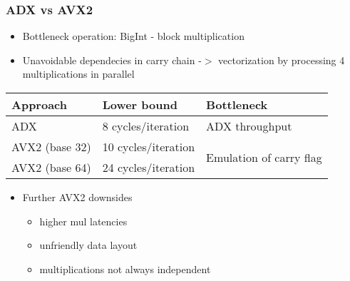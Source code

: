 \begin{frame}
\frametitle{ADX vs AVX2}
\begin{itemize}
\item{Bottleneck operation: BigInt - block multiplication}
\item{Unavoidable dependecies in carry chain -$>$ vectorization by processing 4 multiplications in parallel}
\end{itemize}

\begin{tabular}{| p{3cm} | p{3cm} | p{4.5cm} |}
\hline
\textbf{Approach} & \textbf{Lower bound} & \textbf{Bottleneck}\\ \hline
ADX & 8 cycles/iteration & ADX throughput\\ \hline
AVX2 (base 32) & 10 cycles/iteration & \multirow{2}{3cm}{Emulation of carry flag} \\
AVX2 (base 64) & 24 cycles/iteration & \\
\hline
\end{tabular}

\begin{itemize}
\item{Further AVX2 downsides
\begin{itemize}
\item{higher mul latencies}
\item{unfriendly data layout}
\item{multiplications not always independent}
\end{itemize}
}
\end{itemize}

\end{frame}

